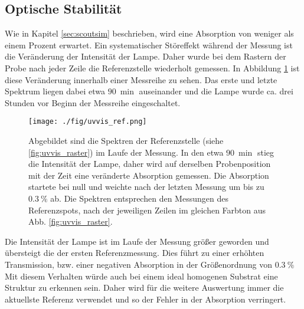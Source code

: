\subsection{Optische Stabilität}
\label{sec:uvvis_stabilitaet}
Wie in Kapitel \ref{sec:scoutsim} beschrieben, wird eine Absorption von weniger als einem Prozent erwartet.
Ein systematischer Störeffekt während der Messung ist die Veränderung der Intensität der Lampe.
Daher wurde bei dem Rastern der Probe nach jeder Zeile die Referenzstelle wiederholt gemessen.
In Abbildung \ref{fig:uvvis_ref} ist diese Veränderung innerhalb einer Messreihe zu sehen.
Das erste und letzte Spektrum liegen dabei etwa $\SI{90}{\min}$ auseinander und die Lampe wurde ca. drei Stunden vor Beginn der Messreihe eingeschaltet.
\begin{figure}
    \centering
    \texttt{[image: ./fig/uvvis\_ref.png]}
    \caption{Abgebildet sind die Spektren der Referenzstelle (siehe \ref{fig:uvvis_raster}) im Laufe der Messung. In den etwa $\SI{90}{\min}$ stieg die Intensität der Lampe, daher wird auf derselben Probenposition mit der Zeit eine veränderte Absorption gemessen.
    Die Absorption startete bei null und weichte nach der letzten Messung um bis zu $\SI{0.3}{\%}$ ab. Die Spektren entsprechen den Messungen des Referenzspots, nach der jeweiligen Zeilen im gleichen Farbton aus Abb. \ref{fig:uvvis_raster}.}
    \label{fig:uvvis_ref}
\end{figure}
Die Intensität der Lampe ist im Laufe der Messung größer geworden und übersteigt die der ersten Referenzmessung. 
Dies führt zu einer erhöhten Transmission, bzw. einer negativen Absorption in der Größenordnung von $\SI{0.3}{\%}$
Mit diesem Verhalten würde auch bei einem ideal homogenen Substrat eine Struktur zu erkennen sein.
Daher wird für die weitere Auswertung immer die aktuellste Referenz verwendet und so der Fehler in der Absorption verringert.
